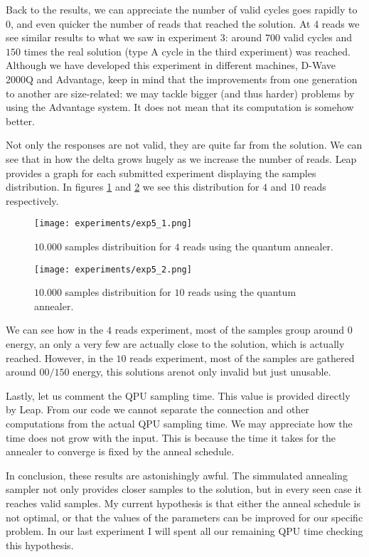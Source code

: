 Back to the results, we can appreciate the number of valid cycles goes rapidly to $0$, and even quicker the number of reads that reached the solution. At 4 reads we see similar results to what we saw in experiment 3: around $700$ valid cycles and $150$ times the real solution (type A cycle in the third experiment) was reached. Although we have developed this experiment in different machines, D-Wave 2000Q and Advantage, keep in mind that the improvements from one generation to another are size-related: we may tackle bigger (and thus harder) problems by using the Advantage system. It does not mean that its computation is somehow better.

Not only the responses are not valid, they are quite far from the solution. We can see that in how the delta grows hugely as we increase the number of reads. Leap provides a graph for each submitted experiment displaying the samples distribution. In figures \ref{fig:exp5_1} and \ref{fig:exp5_2} we see this distribution for $4$ and $10$ reads respectively. 

\begin{figure}[H]
	\texttt{[image: experiments/exp5\_1.png]}
	\centering
	\caption{$10.000$ samples distribuition for $4$ reads using the quantum annealer.}
	\label{fig:exp5_1}
\end{figure}

\begin{figure}[H]
	\texttt{[image: experiments/exp5\_2.png]}
	\centering
	\caption{$10.000$ samples distribuition for $10$ reads using the quantum annealer.}
	\label{fig:exp5_2}
\end{figure}

We can see how in the $4$ reads experiment, most of the samples group around $0$ energy, an only a very few are actually close to the solution, which is actually reached. However, in the $10$ reads experiment, most of the samples are gathered around $00/150$ energy, this solutions arenot only invalid but just unusable.

Lastly, let us comment the QPU sampling time. This value is provided directly by Leap. From our code we cannot separate the connection and other computations from the actual QPU sampling time. We may appreciate how the time does not grow with the input. This is because the time it takes for the annealer to converge is fixed by the anneal schedule.

In conclusion, these results are astonishingly awful. The simmulated annealing sampler not only provides closer samples to the solution, but in every seen case it reaches valid samples. My current hypothesis is that either the anneal schedule is not optimal, or that the values of the parameters can be improved for our specific problem. In our last experiment I will spent all our remaining QPU time checking this hypothesis.


